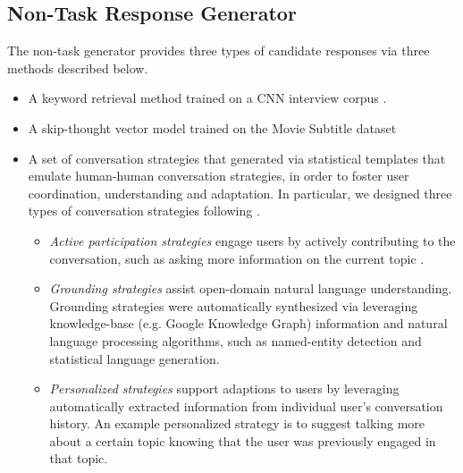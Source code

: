 \documentclass[11pt]{article}
\newcommand{\dk}[1]{{\color{red} #1}}
\begin{document}
\subsection{Non-Task Response Generator}
The non-task generator provides three types of candidate responses via three methods described below. 
\begin{itemize}
\item A keyword retrieval method trained on a CNN interview corpus \cite{yu2015ticktock}.    
\item A skip-thought vector model \cite{kiros2015skip} trained on the Movie Subtitle dataset \cite{lison2016opensubtitles2016} 
\item A set of conversation strategies that generated via statistical templates that emulate human-human conversation strategies, in order to foster user coordination, understanding and adaptation. In particular, we designed three types of conversation strategies following \cite{yu2016sigdial}. 
\begin{itemize}
\item \textit{Active participation strategies} engage users by actively contributing to the conversation, such as asking more information on the current topic \cite{wendler}. 
\item \textit{Grounding strategies} assist open-domain natural language understanding. Grounding strategies were automatically synthesized via leveraging knowledge-base (e.g. Google Knowledge Graph) information and natural language processing algorithms, such as named-entity detection and statistical language generation. %
\item \textit{Personalized strategies} support adaptions to users by leveraging automatically extracted information from individual user's conversation history. An example personalized strategy is to suggest talking more about a certain topic knowing that the user was previously engaged in that topic.    
\end{itemize}

\end{itemize}
\end{document}
